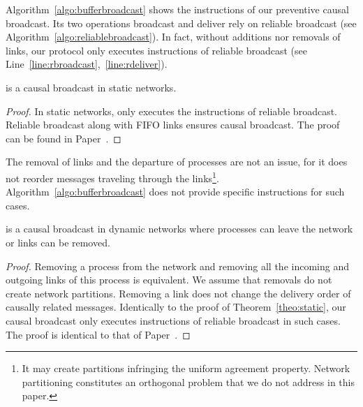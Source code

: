 Algorithm~\ref{algo:bufferbroadcast} shows the instructions of our preventive
causal broadcast. Its two operations broadcast and deliver rely on reliable
broadcast (see Algorithm~\ref{algo:reliablebroadcast}). In fact, without
additions nor removals of links, our protocol only executes instructions of
reliable broadcast (see Line~\ref{line:rbroadcast},~\ref{line:rdeliver}).

\begin{theorem}
  \CBROADCAST is a causal broadcast in static networks.
\end{theorem}

\begin{proof}
  In static networks, \CBROADCAST only executes the instructions of reliable
  broadcast. Reliable broadcast along with FIFO links ensures causal broadcast.
  The proof can be found in Paper~\cite{friedman2004causal}.
\end{proof}

The removal of links and the departure of processes are not an issue, for it
does not reorder messages traveling through the links\footnote{It may create
  partitions infringing the uniform agreement property. Network partitioning
  constitutes an orthogonal problem that we do not address in this
  paper.}. Algorithm~\ref{algo:bufferbroadcast} does not provide specific
instructions for such cases.

\begin{lemma}
  \CBROADCAST is a causal broadcast in dynamic networks where processes can
  leave the network or links can be removed.
\end{lemma}

\begin{proof}
  Removing a process from the network and removing all the incoming and outgoing
  links of this process is equivalent. We assume that removals do not create
  network partitions.  Removing a link does not change the delivery order of
  causally related messages. Identically to the proof of
  Theorem~\ref{theo:static}, our causal broadcast only executes instructions of
  reliable broadcast in such cases. The proof is identical to that of
  Paper~\cite{friedman2004causal}.
\end{proof}

